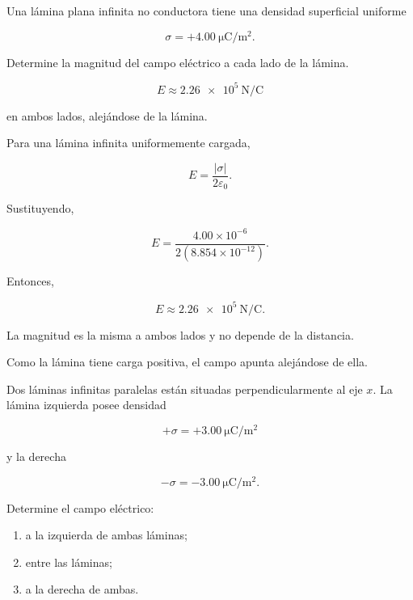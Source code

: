\begin{ejercicio}

Una lámina plana infinita no conductora tiene una densidad superficial uniforme

\[
\sigma=+\SI{4.00}{\micro\coulomb\per\metre\squared}.
\]

Determine la magnitud del campo eléctrico a cada lado de la lámina.

\end{ejercicio}

\begin{respuesta}

\[
\boxed{E\approx\SI{2.26e5}{\newton\per\coulomb}}
\]

en ambos lados, alejándose de la lámina.

\end{respuesta}

\begin{explicacion}

Para una lámina infinita uniformemente cargada,

\[
E=\frac{|\sigma|}{2\varepsilon_0}.
\]

Sustituyendo,

\[
E=
\frac{4.00\times10^{-6}}
{2(8.854\times10^{-12})}.
\]

Entonces,

\[
\boxed{E\approx\SI{2.26e5}{\newton\per\coulomb}}.
\]

La magnitud es la misma a ambos lados y no depende de la distancia.

Como la lámina tiene carga positiva, el campo apunta alejándose de ella.

\end{explicacion}


\begin{ejercicio}

Dos láminas infinitas paralelas están situadas perpendicularmente al eje \(x\).
La lámina izquierda posee densidad

\[
+\sigma=+\SI{3.00}{\micro\coulomb\per\metre\squared}
\]

y la derecha

\[
-\sigma=-\SI{3.00}{\micro\coulomb\per\metre\squared}.
\]

Determine el campo eléctrico:

\begin{enumerate}
    \item a la izquierda de ambas láminas;
    \item entre las láminas;
    \item a la derecha de ambas.
\end{enumerate}

\end{ejercicio}

